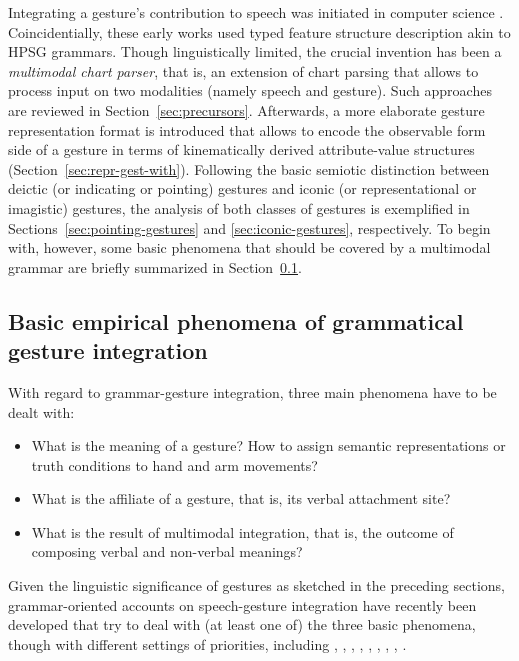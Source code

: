 \documentclass[output=paper]{langsci/langscibook}
\begin{document}
Integrating a gesture's contribution to speech was initiated in computer science \citep{Bolt:1980}.
%
Coincidentially, these early works used typed feature structure description akin to HPSG grammars.
%
Though linguistically limited, the crucial invention has been a \emph{multimodal chart parser},  that is, an extension of chart parsing that allows to process input on two modalities (namely speech and gesture).
%
Such approaches are reviewed in Section~\ref{sec:precursors}.
%
Afterwards, a more elaborate gesture representation format is introduced that allows to encode the observable form side of a gesture in terms of kinematically derived attribute-value structures (Section~\ref{sec:repr-gest-with}).
%
Following the basic semiotic distinction between deictic (or indicating or pointing) gestures and iconic (or representational or imagistic) gestures, the analysis of both classes of gestures is exemplified in Sections~\ref{sec:pointing-gestures} and \ref{sec:iconic-gestures}, respectively.
%
To begin with, however, some basic phenomena that should be covered by a multimodal grammar are briefly summarized in Section~\ref{sec:empir-desid-gramm}.



\subsection{Basic empirical phenomena of grammatical gesture integration}
\label{sec:empir-desid-gramm}

With regard to grammar-gesture integration, three main phenomena have to be dealt with:
%
\begin{itemize}
\item What is the meaning of a gesture? How to assign semantic representations or truth conditions to hand and arm movements? 
\item What is the affiliate of a gesture, that is, its verbal attachment site?  
\item What is the result of multimodal integration, that is, the outcome of composing verbal and non-verbal meanings? 
\end{itemize}

Given the linguistic significance of gestures as sketched in the preceding sections, grammar-oriented accounts on speech-gesture integration have recently been developed that try to deal with (at least one of) the three basic phenomena, though with different settings of priorities, including
%
\citet{Alahverdzhieva:2013}, %
%
\citet{Alahverdzhieva:Lascarides:2010},
%
\cite{Ebert:2014:a},
%
\citet{Giorgolo:2010},
%
\citet{Giorgolo:Asudeh:2011},
%
\citet{Luecking:2013:a,Luecking:2016},
%
\citet{Rieser:2008,Rieser:2011,Rieser:2015},
%
\citet{Rieser:Poesio:2009},
%
\citet{Schlenker:2018}.
\end{document}
